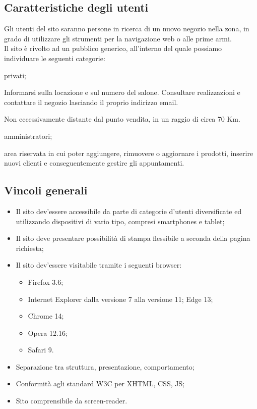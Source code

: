 \subsection{Caratteristiche degli utenti}{
		Gli utenti del sito saranno persone in ricerca di un nuovo negozio nella zona, in grado di utilizzare gli strumenti per la navigazione web o alle prime armi. \\
		Il sito è rivolto ad un pubblico generico, all'interno del quale possiamo individuare le seguenti categorie:
		\begin{description}\itemsep1pt
			\item[Categoria di utenti:] privati;
			\begin{description}\itemsep1pt
				\item[Funzionalità:] Informarsi sulla locazione e sul numero del salone. Consultare realizzazioni e contattare il negozio lasciando il proprio indirizzo email.
				\item[Termini generali:] Non eccessivamente distante dal punto vendita, in un raggio di circa 70 Km.
			\end{description}
			\item[Categoria di utenti:] amministratori;
			\begin{description}\itemsep1pt
				\item[Funzionalità:] area riservata in cui poter aggiungere, rimuovere o aggiornare i prodotti, inserire nuovi clienti e conseguentemente gestire gli appuntamenti. 
			\end{description}
		\end{description}
	\subsection{Vincoli generali}{
		\begin{itemize}\itemsep1pt
			\item Il sito dev'essere accessibile da parte di categorie d'utenti diversificate ed utilizzando dispositivi di vario tipo, compresi smartphones e tablet;
			\item Il sito deve presentare possibilità di stampa flessibile a seconda della pagina richiesta;
			\item Il sito dev'essere visitabile tramite i seguenti browser: 
			\begin{itemize}
				\item Firefox 3.6;
				\item Internet Explorer dalla versione 7 alla versione 11; Edge 13;
				\item Chrome 14;
				\item Opera 12.16;
				\item Safari 9.
			\end{itemize}
			\item Separazione tra struttura, presentazione, comportamento;
			\item Conformità agli standard W3C per XHTML, CSS, JS;
			\item Sito comprensibile da screen-reader.
		\end{itemize}
	}
}
